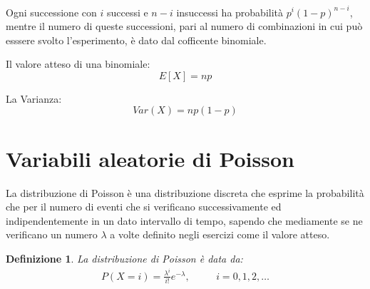 \documentclass[12pt]{article}
\newtheorem{definition}{Definizione}[section]
\begin{document}
Ogni successione con \(i\) successi e \(n-i\) insuccessi ha probabilità \(p^i(1-p)^{n-i}\), mentre il numero
di queste successioni, pari al numero di combinazioni in cui può esssere svolto l'esperimento, 
è dato dal cofficente binomiale.

\newpage
Il valore atteso di una binomiale:
\[
E[X] = np    
\]

La Varianza:
\[
Var(X) = np(1-p)    
\]

\section{Variabili aleatorie di Poisson}
La distribuzione di Poisson è una distribuzione discreta che esprime la probabilità
che per il numero di eventi che si verificano successivamente ed indipendentemente in un 
dato intervallo di tempo, sapendo che mediamente se ne verificano un numero \(\lambda\) a volte 
definito negli esercizi come il valore atteso.

\begin{definition}
    La distribuzione di Poisson è data da:
    \begin{align*}
        P(X=i) = \frac{\lambda^i}{i!}e^{-\lambda}, && \quad i=0,1,2,\dots
    \end{align*}
\end{definition}
\end{document}
